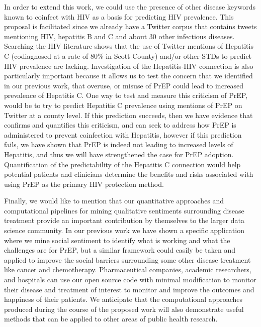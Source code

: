 In order to extend this work, we could use the presence of other disease keywords known to coinfect with HIV as a basis for predicting HIV prevalence. This proposal is facilitated since we already have a Twitter corpus that contains tweets mentioning HIV, hepatitis B and C and about 30 other infectious diseases. Searching the HIV literature shows that the use of Twitter mentions of Hepatitis C (codiagnosed at a rate of 80\% in Scott County\cite{scottcountyhepc}) and/or other STDs to predict HIV prevalence are lacking. Investigation of the Hepatitis-HIV connection is also particularly important because it allows us to test the concern that we identified in our previous work, that overuse, or misuse of PrEP could lead to increased prevalence of Hepatitis C. One way to test and measure this criticism of PrEP, would be to try to predict Hepatitis C prevalence using mentions of PrEP on Twitter at a county level. If this prediction succeeds, then we have evidence that confirms and quantifies this criticism, and can seek to address how PrEP is administered to prevent coinfection with Hepatitis, however if this prediction fails, we have shown that PrEP is indeed not leading to increased levels of Hepatitis, and thus we will have strengthened the case for PrEP adoption. Quantification of the predictability of the Hepatitis C connection would help potential patients and clinicians determine the benefits and risks associated with using PrEP as the primary HIV protection method.

Finally, we would like to mention that our quantitative approaches and computational pipelines for mining qualitative sentiments surrounding disease treatment provide an important contribution by themselves to the larger data science community. In our previous work we have shown a specific application where we mine social sentiment to identify what is working and what the challenges are for PrEP, but a similar framework could easily be taken and applied to improve the social barriers surrounding some other disease treatment like cancer and chemotherapy. Pharmaceutical companies, academic researchers, and hospitals can use our open source code with minimal modification to monitor their disease and treatment of interest to monitor and improve the outcomes and happiness of their patients. We anticipate that the computational approaches produced during the course of the proposed work will also demonstrate useful methods that can be applied to other areas of public health research.


